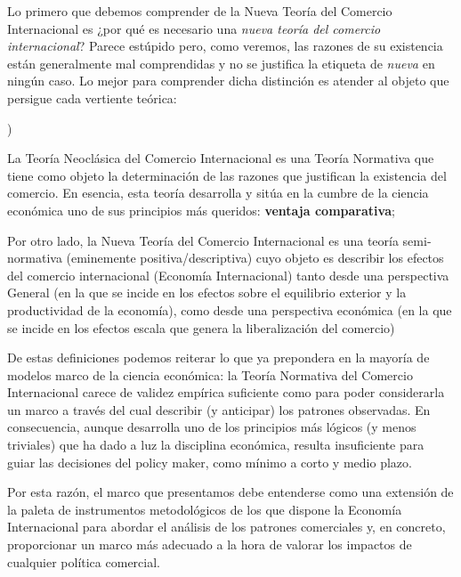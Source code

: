 \documentclass[10pt,a4paper]{article}
\newcounter{alphaitem}
\newenvironment{la}
      {\begin{list}{\alph{alphaitem})}{%
          \usecounter{alphaitem}%
          \setlength{\leftmargin}{1cm}%
          \setlength{\parskip}{3pt}%
          \setlength{\itemsep}{0pt}%
          \setlength{\parsep}{0pt}%
      }}
      {\end{list}}
\begin{document}
Lo primero que debemos comprender de la Nueva Teoría del Comercio Internacional es ¿por qué es necesario una \textit{nueva teoría del comercio internacional}? Parece estúpido pero, como veremos, las razones de su existencia están generalmente mal comprendidas y no se justifica la etiqueta de \textit{nueva} en ningún caso. Lo mejor para comprender dicha distinción es atender al objeto que persigue cada vertiente teórica: 
\begin{la}
    \item La Teoría Neoclásica del Comercio Internacional es una Teoría Normativa que tiene como objeto la determinación de las razones que justifican la existencia del comercio. En esencia, esta teoría desarrolla y sitúa en la cumbre de la ciencia económica uno de sus principios más queridos: \textbf{ventaja comparativa};
    \item Por otro lado, la Nueva Teoría del Comercio Internacional es una teoría semi-normativa (eminemente positiva/descriptiva) cuyo objeto es describir los efectos del comercio internacional (Economía Internacional) tanto desde una perspectiva General (en la que se incide en los efectos sobre el equilibrio exterior y la productividad de la economía), como desde una perspectiva económica (en la que se incide en los efectos escala que genera la liberalización del comercio)
\end{la}

De estas definiciones podemos reiterar lo que ya prepondera en la mayoría de modelos marco de la ciencia económica: la Teoría Normativa del Comercio Internacional carece de validez empírica suficiente como para poder considerarla un marco a través del cual describir (y anticipar) los patrones observadas. En consecuencia, aunque desarrolla uno de los principios más lógicos (y menos triviales) que ha dado a luz la disciplina económica, resulta insuficiente para guiar las decisiones del policy maker, como mínimo a corto y medio plazo.

Por esta razón, el marco que presentamos debe entenderse como una extensión de la paleta de instrumentos metodológicos de los que dispone la Economía Internacional para abordar el análisis de los patrones comerciales y, en concreto, proporcionar un marco más adecuado a la hora de valorar los impactos de cualquier política comercial. 
\end{document}
